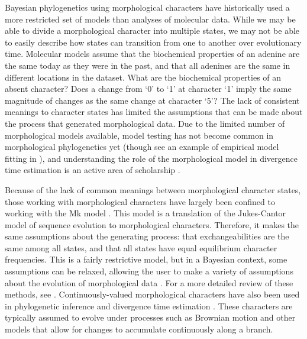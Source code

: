 \documentclass[11pt]{article}
\begin{document}
Bayesian phylogenetics using morphological characters have
historically used a more restricted set of models than analyses of molecular data.
While we may be able to divide a morphological character into multiple states, we may not be able to easily describe how states can transition from one to another over evolutionary time.
Molecular models assume that the biochemical properties of an adenine are the same today as they were in the past, and
that all adenines are the same in different locations in the dataset.
What are the biochemical properties of an absent character?
Does a change from `0' to `1' at character `1' imply the same magnitude of changes as the same change at character `5'?
The lack of consistent meanings to character states has limited the assumptions that can be made about the process that generated morphological data.
Due to the limited number of morphological models available, model testing has not become common in morphological phylogenetics yet (though see an example of empirical model fitting in \cite*{bapst2017}), and understanding the role of the morphological model in divergence time estimation is an active area of scholarship \cite{Klopfstein2019}. 

Because of the lack of common meanings between morphological character states, those working with morphological characters have largely been confined to working with the Mk model \cite{Lewis2001}.
This model is a translation of the Jukes-Cantor model \cite{Jukes1969} of sequence evolution to morphological characters.
Therefore, it makes the same assumptions about the generating process: that exchangeabilities are the same among all states, and that all states have equal equilibrium character frequencies.
This is a fairly restrictive model, but in a Bayesian context, some assumptions can be relaxed, allowing the user to make a variety of assumptions about the evolution of morphological data \cite{Nylander2004, Wright2016}.
For a more detailed review of these methods, see \cite{Wright2019}. 
Continuously-valued morphological characters have also been used in phylogenetic inference \cite{goloboff2006, parins2017} and divergence time estimation \cite{AlvarezC2019}.
These characters are typically assumed to evolve under processes such as Brownian motion and other models that allow for changes to accumulate continuously along a branch.  
\end{document}
